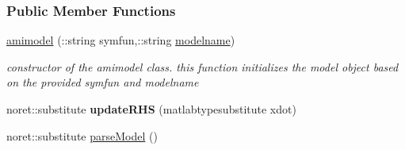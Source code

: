 \subsubsection*{Public Member Functions}
\begin{DoxyCompactItemize}
\item 
\hyperlink{classamimodel_a05d52506788717b3d482845748446a60}{amimodel} (\+::string symfun,\+::string \hyperlink{classamimodel_a71bca9c21a6de42d8079ade31cb61044}{modelname})
\begin{DoxyCompactList}\small\item\em constructor of the amimodel class. this function initializes the model object based on the provided symfun and modelname \end{DoxyCompactList}\item 
\hypertarget{classamimodel_aa508c0cd4ac026e464f85cec25678850}{}noret\+::substitute {\bfseries update\+R\+H\+S} (matlabtypesubstitute xdot)\label{classamimodel_aa508c0cd4ac026e464f85cec25678850}

\item 
\hypertarget{classamimodel_ae4172c2a8fac8b7c434f03274fcac6ac}{}noret\+::substitute \hyperlink{classamimodel_ae4172c2a8fac8b7c434f03274fcac6ac}{parse\+Model} ()\label{classamimodel_ae4172c2a8fac8b7c434f03274fcac6ac}


\end{DoxyCompactItemize}
